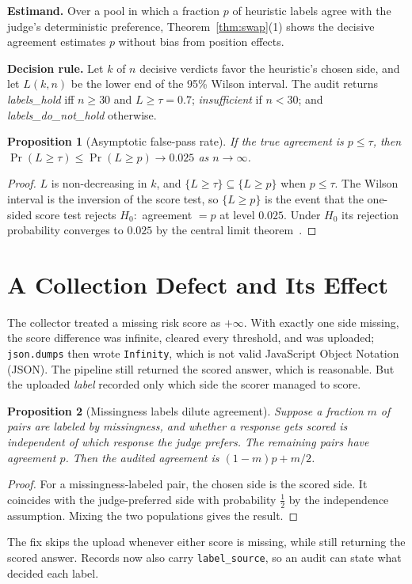 \documentclass[conference]{IEEEtran}
\newtheorem{proposition}{Proposition}
\theoremstyle{remark}
\begin{document}
\textbf{Estimand.} Over a pool in which a fraction $p$ of heuristic labels agree with the judge's deterministic preference, Theorem~\ref{thm:swap}(1) shows the decisive agreement estimates $p$ without bias from position effects.

\textbf{Decision rule.} Let $k$ of $n$ decisive verdicts favor the heuristic's chosen side, and let $L(k,n)$ be the lower end of the 95\% Wilson interval. The audit returns \emph{labels\_hold} iff $n\ge30$ and $L\ge\tau=0.7$; \emph{insufficient} if $n<30$; and \emph{labels\_do\_not\_hold} otherwise.

\begin{proposition}[Asymptotic false-pass rate]\label{prop:falsepass}
If the true agreement is $p\le\tau$, then $\Pr(L\ge\tau)\le\Pr(L\ge p)\to0.025$ as $n\to\infty$.
\end{proposition}
\begin{proof}
$L$ is non-decreasing in $k$, and $\{L\ge\tau\}\subseteq\{L\ge p\}$ when $p\le\tau$. The Wilson interval is the inversion of the score test, so $\{L\ge p\}$ is the event that the one-sided score test rejects $H_0\colon$ agreement $=p$ at level $0.025$. Under $H_0$ its rejection probability converges to $0.025$ by the central limit theorem~\cite{brown2001}.
\end{proof}

\section{A Collection Defect and Its Effect}\label{sec:defect}
The collector treated a missing risk score as $+\infty$. With exactly one side missing, the score difference was infinite, cleared every threshold, and was uploaded; \texttt{json.dumps} then wrote \texttt{Infinity}, which is not valid JavaScript Object Notation (JSON). The pipeline still returned the scored answer, which is reasonable. But the uploaded \emph{label} recorded only which side the scorer managed to score.

\begin{proposition}[Missingness labels dilute agreement]\label{prop:missing}
Suppose a fraction $m$ of pairs are labeled by missingness, and whether a response gets scored is independent of which response the judge prefers. The remaining pairs have agreement $p$. Then the audited agreement is $(1-m)p+m/2$.
\end{proposition}
\begin{proof}
For a missingness-labeled pair, the chosen side is the scored side. It coincides with the judge-preferred side with probability $\tfrac12$ by the independence assumption. Mixing the two populations gives the result.
\end{proof}
The fix skips the upload whenever either score is missing, while still returning the scored answer. Records now also carry \texttt{label\_source}, so an audit can state what decided each label.
\end{document}
